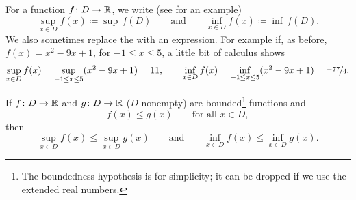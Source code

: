 \begin{myfigureht}
\caption{Example of a bounded function, a bound $M$, and its supremum and infimum.\label{boundedfuncfig}}
\end{myfigureht}
For a function $f \colon D \to {\mathbb{R}}$, we write
(see  for
an example)
\begin{equation*}
\sup_{x \in D} f(x) \coloneqq \sup\, f(D) \qquad \text{and} \qquad
\inf_{x \in D} f(x) \coloneqq \inf\, f(D) .
\end{equation*}
We also sometimes replace the  with an expression.
For example if, as before, $f(x) = x^2-9x+1$, for $-1 \leq x \leq 5$,
a little bit of calculus shows
\begin{equation*}
\sup_{x \in D} f(x) =
\sup_{-1 \leq x \leq 5} ( x^2 -9x+1 ) = 11,
\qquad
\inf_{x \in D} f(x) =
\inf_{-1 \leq x \leq 5} ( x^2 -9x+1 ) = \nicefrac{-77}{4} .
\end{equation*}



\begin{prop} \label{prop:funcsupinf}
If $f \colon D \to {\mathbb{R}}$ and $g \colon D \to {\mathbb{R}}$ ($D$ nonempty) are
bounded\footnote{The boundedness hypothesis is for simplicity;
it can be dropped if we use the extended real numbers.}
functions and
\begin{equation*}
f(x) \leq g(x) \qquad \text{for all } x \in D,
\end{equation*}
then
\begin{equation} \label{prop:funcsupinf:eq}
\sup_{x \in D} f(x) \leq \sup_{x \in D} g(x)
\qquad \text{and} \qquad
\inf_{x \in D} f(x) \leq \inf_{x \in D} g(x) .
\end{equation}
\end{prop}


